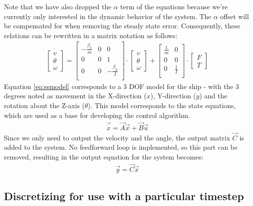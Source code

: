 Note that we have also dropped the $ \alpha $ term of the equations because we're currently only interested in the dynamic behavior of the system. The $ \alpha $ offset will be compensated for when removing the steady state error. Consequently, these relations can be rewritten in a matrix notation as follows:
\begin{align}
\dot{
	\begin{bmatrix}
	 v\\
	 \theta\\
	 \omega
	\end{bmatrix}
}
=
\begin{bmatrix}
 -\frac{\beta_{x}}{m} & 0 & 0\\
 0 & 0 & 1\\
 0 & 0 & - \frac{\beta_{y}}{I}\\
\end{bmatrix}
\cdot
\begin{bmatrix}
v\\
\theta\\
\omega
\end{bmatrix}
+
\begin{bmatrix}
\frac{1}{m} & 0\\
0 & 0\\
0 & \frac{1}{I}\\
\end{bmatrix}
\cdot
\begin{bmatrix}
F\\
T
\end{bmatrix}
\label{eq:ssmodel}
\end{align}
Equation \vref{eq:ssmodel} corresponds to a 3 \ac{DOF} model for the ship - with the 3 degrees noted as movement in the X-direction ($x$), Y-direction ($y$) and the rotation about the Z-axis ($\theta$). This model corresponds to the state equations, which are used as a base for developing the control algorithm.
\begin{align}
\vec{\dot{x}} = \vec{A}\vec{x} + \vec{B}\vec{u}
\end{align}
Since we only need to output the velocity and the angle, the output matrix $\vec{C}$ is added to the system. No feedforward loop is implemented, so this part can be removed, resulting in the output equation for the system becomes:
\begin{align}
\vec{y} = \vec{C}\vec{x}
\end{align}

\subsection{Discretizing for use with a particular timestep}

